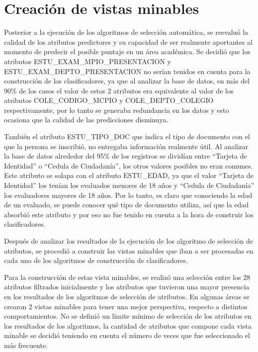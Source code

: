 \section{Creación de vistas minables}
Posterior a la ejecución de los algoritmos de selección automática, se reevaluó la calidad de los atributos predictores y su capacidad de ser realmente aportantes al momento de predecir el posible puntaje en un área académica. Se decidió que los atributos ESTU_EXAM_MPIO_PRESENTACION y ESTU_EXAM_DEPTO_PRESENTACION no serían tenidos en cuenta para la construcción de los clasificadores, ya que al analizar la base de datos, en más del 90\% de los casos el valor de estos 2 atributos era equivalente al valor de los atributos COLE_CODIGO_MCPIO y COLE_DEPTO_COLEGIO respectivamente, por lo tanto se generaba redundancia en los datos y esto ocasiona que la calidad de las predicciones disminuya. 

También el atributo ESTU_TIPO_DOC que indica el tipo de documento con el que la persona se inscribió, no entregaba información realmente útil. Al analizar la base de datos alrededor del 95\% de los registros se dividían entre ``Tarjeta de Identidad'' o “Cedula de Ciudadanía”, los otros valores posibles no eran comunes. Este atributo se solapa con el atributo ESTU_EDAD, ya que el valor “Tarjeta de Identidad” los tenían los evaluados menores de 18 años y “Cedula de Ciudadanía” los evaluadores mayores de 18 años. Por lo tanto, es claro que conociendo la edad de un evaluado, se puede conocer qué tipo de documento utiliza, así que la edad absorbió este atributo y por eso no fue tenido en cuenta a la hora de construir los clasificadores.

Después de analizar los resultados de la ejecución de los algoritmo de selección de atributos, se procedió a construir las vistas minables que iban a ser procesadas en cada uno de los algoritmos de construcción de clasificadores.

Para la construcción de estas vista minables, se realizó una selección entre los 28 atributos filtrados inicialmente y los atributos que tuvieron una mayor presencia en los resultados de los algoritmos de selección de atributos. En algunas áreas se crearon 2 vistas minables para tener una mejor perspectiva, respecto a distintos comportamientos. No se definió un límite mínimo de selección de los atributos en los resultados de los algoritmos, la cantidad de atributos que compone cada vista minable se decidió teniendo en cuenta el número de veces que fue seleccionado el más frecuente.

